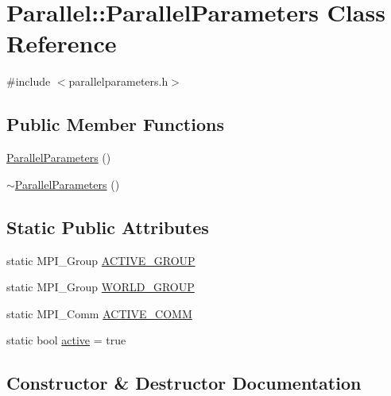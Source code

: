 \hypertarget{class_parallel_1_1_parallel_parameters}{}\section{Parallel\+::Parallel\+Parameters Class Reference}
\label{class_parallel_1_1_parallel_parameters}


{\ttfamily \#include $<$parallelparameters.\+h$>$}

\subsection*{Public Member Functions}
\begin{DoxyCompactItemize}
\item 
\mbox{\hyperlink{class_parallel_1_1_parallel_parameters_a2068a2c53eac28cb70a8e7ec04e4be2c}{Parallel\+Parameters}} ()
\item 
\mbox{\hyperlink{class_parallel_1_1_parallel_parameters_aa93639196cdcae74d5778a9353aec5aa}{$\sim$\+Parallel\+Parameters}} ()
\end{DoxyCompactItemize}
\subsection*{Static Public Attributes}
\begin{DoxyCompactItemize}
\item 
static M\+P\+I\+\_\+\+Group \mbox{\hyperlink{class_parallel_1_1_parallel_parameters_a5cc87e4f375583de885186993ef234a4}{A\+C\+T\+I\+V\+E\+\_\+\+G\+R\+O\+UP}}
\item 
static M\+P\+I\+\_\+\+Group \mbox{\hyperlink{class_parallel_1_1_parallel_parameters_a8281c0a5cb7f2000ed42c56a30ca9ec8}{W\+O\+R\+L\+D\+\_\+\+G\+R\+O\+UP}}
\item 
static M\+P\+I\+\_\+\+Comm \mbox{\hyperlink{class_parallel_1_1_parallel_parameters_a5af42395382d7f7b2f8ece0ecf42c7ab}{A\+C\+T\+I\+V\+E\+\_\+\+C\+O\+MM}}
\item 
static bool \mbox{\hyperlink{class_parallel_1_1_parallel_parameters_ad23c4c18e1f73cb00cee9fa7a6373e69}{active}} = true
\end{DoxyCompactItemize}


\subsection{Constructor \& Destructor Documentation}
\mbox{\label{class_parallel_1_1_parallel_parameters_a2068a2c53eac28cb70a8e7ec04e4be2c}} 
